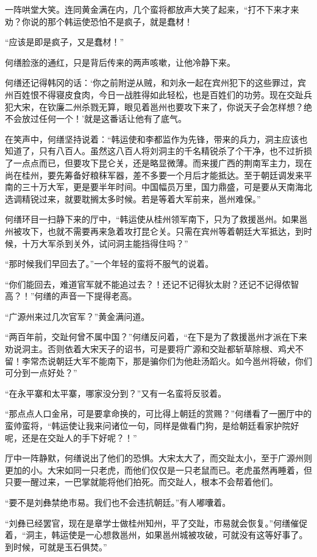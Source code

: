 一阵哄堂大笑。连同黄金满在内，几个蛮将都放声大笑了起来，“打不下来才来劝？你说的那个韩运使恐怕不是疯子，就是蠢材！

“应该是即是疯子，又是蠢材！”

何缮脸涨的通红，只是背后传来的两声咳嗽，让他冷静下来。

何缮还记得韩冈的话：‘你之前附逆从贼，和刘永一起在宾州犯下的这些罪过，宾州百姓恨不得寝皮食肉，今日一战胜得如此轻松，也是百姓们的功劳。现在交趾兵犯大宋，在钦廉二州杀戮无算，眼见着邕州也要攻下来了，你说天子会怎样想？绝不会放过任何一个！’就是这番话让他有了底气。

在笑声中，何缮坚持说着：“韩运使和李都监作为先锋，带来的兵力，洞主应该也知道了，只有八百人。虽然这八百人将刘洞主的千名精锐杀了个干净，也不过折损了一点点而已，但要攻下昆仑关，还是略显微薄。而来援广西的荆南军主力，现在尚在桂州，要先筹备好粮秣军器，差不多要一个月后才能抵达。至于朝廷调发来平南的三十万大军，更是要半年时间。中国幅员万里，国力鼎盛，可是要从天南海北选调精锐过来，就要耽搁太多时候。若是等着大军前来，邕州难保。”

何缮环目一扫静下来的厅中，“韩运使从桂州领军南下，只为了救援邕州。如果邕州被攻下，也就不需要再来急着攻打昆仑关。只需在宾州等着朝廷大军抵达，到时候，十万大军杀到关外，试问洞主能挡得住吗？”

“那时候我们早回去了。”一个年轻的蛮将不服气的说着。

“你们能回去，难道官军就不能追过去？！还记不记得狄太尉？还记不记得侬智高？！”何缮的声音一下提得老高。

“广源州来过几次官军？”黄金满问道。

“两百年前，交趾何曾不属中国？”何缮反问着，“在下是为了救援邕州才派在下来劝说洞主。否则依着大宋天子的诏书，可是要将广源和交趾都斩草除根、鸡犬不留！李常杰说朝廷大军不能南下，那是骗你们为他赴汤蹈火。如今邕州将破，你们可分到一点好处？”

“在永平寨和太平寨，哪家没分到？”又有一名蛮将反驳着。

“那点点人口金帛，可是要拿命换的，可比得上朝廷的赏赐？”何缮看了一圈厅中的蛮帅蛮将，“韩运使让我来问诸位一句，同样是做看门狗，是给朝廷看家护院好呢，还是在交趾人的手下好呢？！”

厅中一阵静默，何缮说出了他们的恐惧。大宋太大了，而交趾太小，至于广源州则更加的小。大宋如同一只老虎，而他们仅仅是一只老鼠而已。老虎虽然再睡着，但只要一醒过来，一巴掌就能将他们拍死。而交趾人，根本不会帮着他们。

“要不是刘彝禁绝市易。我们也不会违抗朝廷。”有人嘟囔着。

“刘彝已经罢官，现在是章学士做桂州知州，平了交趾，市易就会恢复。”何缮催促着，“洞主，韩运使是一心想救邕州，如果邕州城被攻破，可就没有这等好事了。到时候，可就是玉石俱焚。”

